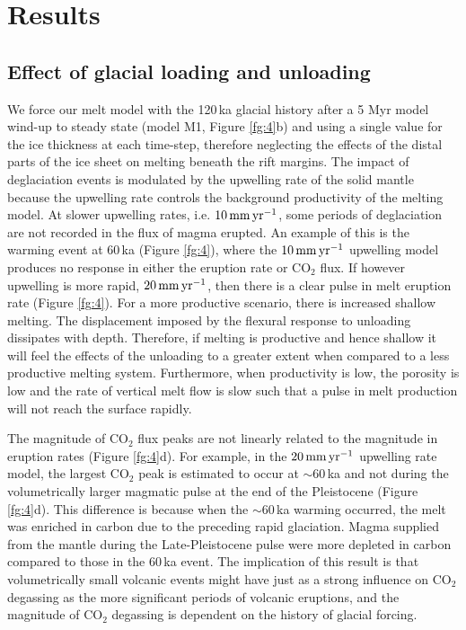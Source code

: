 \documentclass[draft,linenumbers]{agujournal2018}
\begin{document}
\section{Results}
\subsection{Effect of glacial loading and unloading}

We force our melt model with the 120\,ka glacial history after a 5 Myr model wind-up to steady state (model M1, Figure \ref{fg:4}b) and using a single value for the ice thickness at each time-step, therefore neglecting the effects of the distal parts of the ice sheet on melting beneath the rift margins. The impact of deglaciation events is modulated by the upwelling rate of the solid mantle because the upwelling rate controls the background productivity of the melting model. At slower upwelling rates, i.e. $10\rm\,mm\,yr^{-1}$, some periods of deglaciation are not recorded in the flux of magma erupted. An example of this is the warming event at 60\,ka (Figure \ref{fg:4}), where the $10\rm\,mm\,yr^{-1}$ upwelling model produces no response in either the eruption rate or CO$_{2}$ flux. If however upwelling is more rapid, $20\rm\,mm\,yr^{-1}$, then there is a clear pulse in melt eruption rate (Figure \ref{fg:4}). For a more productive scenario, there is increased shallow melting. The displacement imposed by the flexural response to unloading dissipates with depth. Therefore, if melting is productive and hence shallow it will feel the effects of the unloading to a greater extent when compared to a less productive melting system. Furthermore, when productivity is low, the porosity is low and the rate of vertical melt flow is slow such that a pulse in melt production will not reach the surface rapidly.

The magnitude of CO$_{2}$ flux peaks are not linearly related to the magnitude in eruption rates (Figure \ref{fg:4}d). For example, in the $20\rm\,mm\,yr^{-1}$ upwelling rate model, the largest CO$_{2}$ peak is estimated to occur at $\sim$60\,ka and not during the volumetrically larger magmatic pulse at the end of the Pleistocene (Figure \ref{fg:4}d). This difference is because when the $\sim$60\,ka warming occurred, the melt was enriched in carbon due to the preceding rapid glaciation. Magma supplied from the mantle during the Late-Pleistocene pulse were more depleted in carbon compared to those in the 60\,ka event. The implication of this result is that volumetrically small volcanic events might have just as a strong influence on CO$_{2}$ degassing as the more significant periods of volcanic eruptions, and the magnitude of CO$_{2}$ degassing is dependent on the history of glacial forcing.
\end{document}
